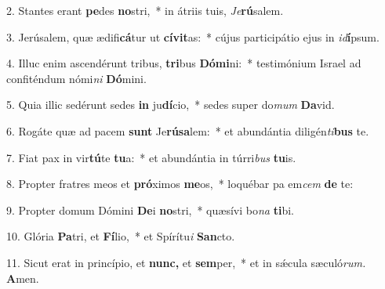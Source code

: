 \item 2. Stantes erant \textbf{pe}des \textbf{no}stri,~* in átriis tuis, \thinspace\textit{Je}\textbf{rú}salem.

\item 3. Jerúsalem, quæ ædifi\textbf{cá}tur ut \textbf{cívit}as:~* cújus participátio ejus in \textit{id}\textbf{í}psum.

\item 4. Illuc enim ascendérunt tribus, \textbf{tri}bus \textbf{Dómi}ni:~* testimónium Israel ad confiténdum nómi\textit{ni} \textbf{Dó}mini.

\item 5. Quia illic sedérunt sedes \textbf{in} ju\textbf{dí}cio,~* sedes super do\textit{mum} \textbf{Da}vid.

\item 6. Rogáte quæ ad pacem \textbf{sunt} Je\textbf{rúsa}lem:~* et abundántia diligén\textit{ti}\textbf{bus} te.

\item 7. Fiat pax in vir\textbf{tú}te \textbf{tu}a:~* et abundántia in túrri\textit{bus} \textbf{tu}is.

\item 8. Propter fratres meos et \textbf{pró}ximos \textbf{me}os,~* loquébar pa em\textit{cem} \textbf{de} te:

\item 9. Propter domum Dómini \textbf{De}i \textbf{no}stri,~* quæsívi bo\textit{na} \textbf{ti}bi.

\item 10. Glória \textbf{Pa}tri, et \textbf{Fí}lio,~* et Spírítu\textit{i} \textbf{San}cto.

\item 11. Sicut erat in princípio, et \textbf{nunc,} et \textbf{sem}per,~* et in sǽcula sæculó\textit{rum.} \textbf{A}men.